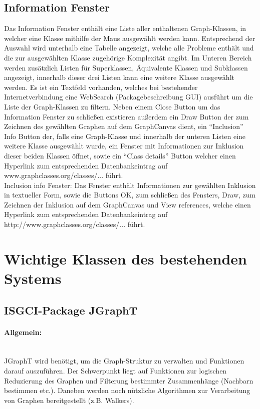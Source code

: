 \documentclass[10pt,a4paper]{article}
\begin{document}
\subsection{Information Fenster}
Das Information Fenster enthält eine Liste aller enthaltenen Graph-Klassen, in welcher eine Klasse mithilfe der Maus ausgewählt werden kann. Entsprechend der Auswahl wird unterhalb eine Tabelle angezeigt, welche alle Probleme enthält und die zur ausgewählten Klasse zugehörige Komplexität angibt. Im Unteren Bereich werden zusätzlich Listen für Superklassen, Äquivalente Klassen und Subklassen angezeigt, innerhalb dieser drei Listen kann eine weitere Klasse ausgewählt werden. Es ist ein Textfeld vorhanden, welches bei bestehender Internetverbindung eine WebSearch (Packagebeschreibung GUI) ausführt um die Liste der Graph-Klassen zu filtern. Neben einem Close Button um das Information Fenster zu schließen existieren außerdem ein Draw Button der zum Zeichnen des gewählten Graphen auf dem GraphCanvas dient, ein "`Inclusion"' Info Button der, falls eine Graph-Klasse und innerhalb der unteren Listen eine weitere Klasse ausgewählt wurde, ein Fenster mit Informationen zur Inklusion dieser beiden Klassen öffnet, sowie ein "`Class details"' Button welcher einen Hyperlink zum entsprechenden Datenbankeintrag auf www.graphclasses.org/classes/... führt.\\
Inclusion info Fenster: Das Fenster enthält Informationen zur gewählten Inklusion in textueller Form, sowie die Buttons OK, zum schließen des Fensters, Draw, zum Zeichnen der Inklusion auf dem GraphCanvas und View references, welche einen Hyperlink zum entsprechenden Datenbankeintrag auf http://www.graphclasses.org/classes/... führt.
\newpage
\section{Wichtige Klassen des bestehenden Systems}
\subsection{ISGCI-Package JGraphT}

\paragraph{Allgemein:}\ \\
JGraphT wird benötigt, um die Graph-Struktur zu verwalten und Funktionen darauf auszuführen. Der Schwerpunkt liegt auf Funktionen zur logischen Reduzierung des Graphen und Filterung bestimmter Zusammenhänge (Nachbarn bestimmen etc.). Daneben werden noch nützliche Algorithmen zur Verarbeitung von Graphen bereitgestellt (z.B. Walkers).\\
\end{document}
